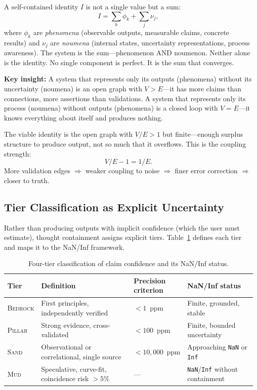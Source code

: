 \documentclass[11pt]{article}
\theoremstyle{definition}
\theoremstyle{remark}
\newcommand{\NaN}{\texttt{NaN}}
\newcommand{\Inf}{\texttt{Inf}}
\newcommand{\BEDROCK}{\textsc{Bedrock}}
\newcommand{\PILLAR}{\textsc{Pillar}}
\newcommand{\SAND}{\textsc{Sand}}
\newcommand{\MUD}{\textsc{Mud}}
\begin{document}
A self-contained identity $I$ is not a single value but a sum:
\begin{equation}
  I = \sum_{k} \phi_k + \sum_{j} \nu_j,
  \label{eq:identity-sum-simple}
\end{equation}
where $\phi_k$ are \emph{phenomena} (observable outputs, measurable claims,
concrete results) and $\nu_j$ are \emph{noumena} (internal states, uncertainty
representations, process awareness).  The system is the sum---phenomenon AND
noumenon.  Neither alone is the identity.  No single component is perfect.  It
is the sum that converges.

\medskip
\noindent\textbf{Key insight:}  A system that represents only its outputs
(phenomena) without its uncertainty (noumena) is an open graph with $V > E$---it
has more claims than connections, more assertions than validations.  A system that
represents only its process (noumena) without outputs (phenomena) is a closed
loop with $V = E$---it knows everything about itself and produces nothing.

The viable identity is the open graph with $V/E > 1$ but finite---enough surplus
structure to produce output, not so much that it overflows.  This is the coupling
strength:
\[
  V/E - 1 = 1/E.
\]
More validation edges $\Rightarrow$ weaker coupling to noise $\Rightarrow$ finer
error correction $\Rightarrow$ closer to truth.

\subsection{Tier Classification as Explicit Uncertainty}
\label{sec:tier-classification}

Rather than producing outputs with implicit confidence (which the user must
estimate), thought containment assigns explicit tiers.
Table~\ref{tab:tiers} defines each tier and maps it to the NaN/Inf framework.

\begin{table}[ht]
\centering
\caption{Four-tier classification of claim confidence and its NaN/Inf status.}
\label{tab:tiers}
\begin{tabular}{@{}lp{3.8cm}p{3.5cm}p{3.5cm}@{}}
\toprule
\textbf{Tier} & \textbf{Definition} & \textbf{Precision criterion} & \textbf{NaN/Inf status} \\
\midrule
\BEDROCK & First principles, independently verified & $< 1$~ppm   & Finite, grounded, stable \\
\PILLAR  & Strong evidence, cross-validated          & $< 100$~ppm & Finite, bounded uncertainty \\
\SAND    & Observational or correlational, single source & $< 10{,}000$~ppm & Approaching \NaN{} or \Inf{} \\
\MUD     & Speculative, curve-fit, coincidence risk $> 5\%$ & --- & \NaN/\Inf{} without containment \\
\bottomrule
\end{tabular}
\end{table}
\end{document}
